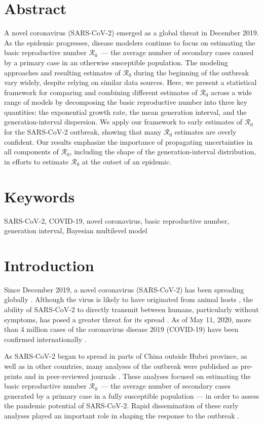 \documentclass[12pt]{article}
\newcommand{\Ro}{\ensuremath{{\mathcal R}_{0}}\xspace}
\begin{document}
\section*{Abstract}
A novel coronavirus (SARS-CoV-2) emerged as a global threat in December 2019. 
As the epidemic progresses, disease modelers continue to focus on estimating the basic reproductive number \Ro\ --- the average number of secondary cases caused by a primary case in an otherwise susceptible population.
The modeling approaches and resulting estimates of \Ro during the beginning of the outbreak vary widely, despite relying on similar data sources.
Here, we present a statistical framework for comparing and combining different estimates of \Ro across a wide range of models by decomposing the basic reproductive number into three key quantities: the exponential growth rate, the mean generation interval, and the generation-interval dispersion.
We apply our framework to early estimates of \Ro for the SARS-CoV-2 outbreak, showing that many \Ro estimates are overly confident.
Our results emphasize the importance of propagating uncertainties in all components of \Ro, including the shape of the generation-interval distribution, in efforts to estimate \Ro at the outset of an epidemic.

\section*{Keywords}

SARS-CoV-2, COVID-19, novel coronavirus, basic reproductive number, generation interval, Bayesian multilevel model

\section{Introduction}

Since December 2019, a novel coronavirus (SARS-CoV-2) has been spreading globally \citep{pneumonia}.
Although the virus is likely to have originated from animal hosts \citep{andersen2020proximal}, the ability of SARS-CoV-2 to directly transmit between humans, particularly without symptoms, has posed a greater threat for its spread \citep{he2020temporal}.
As of May 11, 2020, more than 4 million cases of the coronavirus disease 2019 (COVID-19) have been confirmed internationally \citep{who112}.

As SARS-CoV-2 began to spread in parts of China outside Hubei province, as well as in other countries, many analyses of the outbreak were published as pre-prints \citep{bedfordncov, imaincov, liuncov, majumderncov, readncov, zhaoncov} and in peer-reviewed journals \citep{li2020early, riou2020pattern, wu2020nowcasting, zhao2020preliminary}.
These analyses focused on estimating the basic reproductive number \Ro\ --- the average number of secondary cases generated by a primary case in a fully susceptible population \citep{anderson1991infectious, diekmann1990definition} --- in order to assess the pandemic potential of SARS-CoV-2.
Rapid dissemination of these early analyses played an important role in shaping the response to the outbreak \citep{majumder2020early}.
\end{document}
